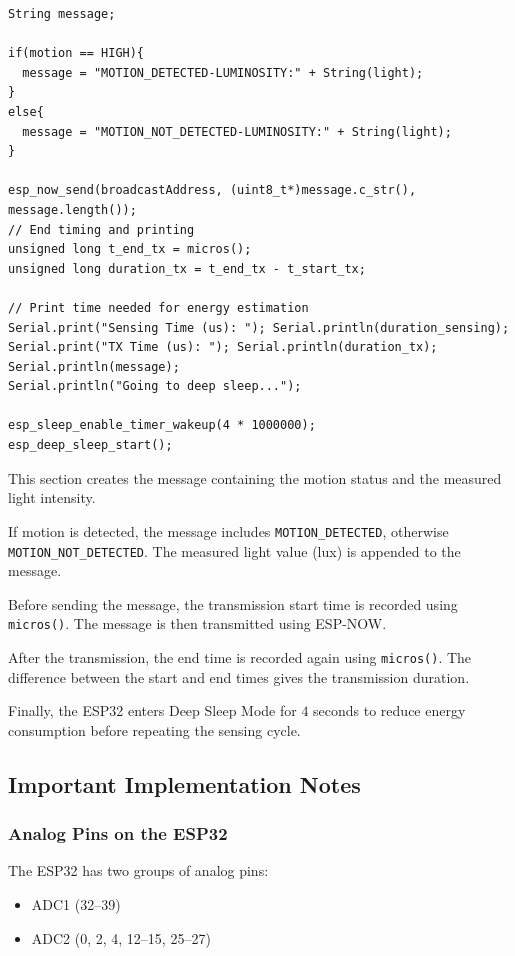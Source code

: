\documentclass[11pt,a4paper]{article}
\begin{document}
\begin{lstlisting}
String message;

if(motion == HIGH){
  message = "MOTION_DETECTED-LUMINOSITY:" + String(light);
}
else{
  message = "MOTION_NOT_DETECTED-LUMINOSITY:" + String(light);
}

esp_now_send(broadcastAddress, (uint8_t*)message.c_str(), message.length());
// End timing and printing
unsigned long t_end_tx = micros();
unsigned long duration_tx = t_end_tx - t_start_tx;

// Print time needed for energy estimation
Serial.print("Sensing Time (us): "); Serial.println(duration_sensing);
Serial.print("TX Time (us): "); Serial.println(duration_tx);
Serial.println(message);
Serial.println("Going to deep sleep...");

esp_sleep_enable_timer_wakeup(4 * 1000000);
esp_deep_sleep_start();
\end{lstlisting}

This section creates the message containing the motion status and the measured light intensity.

If motion is detected, the message includes \texttt{MOTION\_DETECTED}, otherwise \texttt{MOTION\_NOT\_DETECTED}. The measured light value (lux) is appended to the message.

Before sending the message, the transmission start time is recorded using \texttt{micros()}. The message is then transmitted using ESP-NOW.

After the transmission, the end time is recorded again using \texttt{micros()}. The difference between the start and end times gives the transmission duration.

Finally, the ESP32 enters Deep Sleep Mode for $4$ seconds to reduce energy consumption before repeating the sensing cycle.
\subsection*{Important Implementation Notes}

\subsubsection*{Analog Pins on the ESP32}

The ESP32 has two groups of analog pins:

\begin{itemize}
\item ADC1 (32--39)
\item ADC2 (0, 2, 4, 12--15, 25--27)
\end{itemize}
\end{document}
